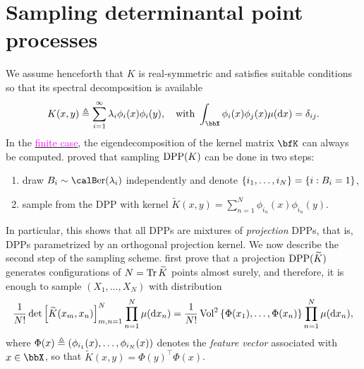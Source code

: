 \documentclass[twoside,11pt]{article}
\begin{document}

    \section{Sampling determinantal point processes} %
    \label{sec:sampling}

          We assume henceforth that $K$ is real-symmetric and satisfies suitable conditions \cite[Theorem 3]{Sos00} so that its spectral decomposition is available
          \begin{equation*}
          \label{eq:eigdec_kernel}
            K(x,y)
            \triangleq
              \suml_{i=1}^{\infty}
                \lambda_i \phi_i(x) \phi_i(y),
              \quad \text{with }
                \int_{\bbX} \phi_i(x) \phi_j(x) \mu(\diff x) = \delta_{ij}.
          \end{equation*}
          In the \href{https://dppy.readthedocs.io/en/latest/finite_dpps/exact_sampling.html}{\textcolor{magenta}{finite case}}, the eigendecomposition of the kernel matrix $\bfK$ can always be computed.
          \citet[Theorem 7, Algorithm 18]{HKPV06} proved that sampling $\operatorname{DPP}(K)$ can be done in two steps:
          \begin{enumerate}
            \item draw $B_i\sim\Ber(\lambda_i)$ independently and denote $\left\{ i_1,\dots,i_{N} \right\} = \left\{ i:B_i=1 \right\}$,
            \item sample from the DPP with kernel $\tilde{K}(x,y) = \sum_{n=1}^{N}\phi_{i_n}(x) \phi_{i_n}(y)$.
          \end{enumerate}
          In particular, this shows that all DPPs are mixtures of \emph{projection} DPPs, that is, DPPs parametrized by an orthogonal projection kernel.
          We now describe the second step of the sampling scheme.
          \cite{HKPV06} first prove that a projection $\operatorname{DPP}(\widetilde{K})$ generates configurations of $N=\operatorname{Tr} \widetilde{K}$ points almost surely, and therefore, it is enough to sample $(X_1,\dots,X_N)$ with distribution
          \begin{equation}
          \label{eq:joint_distribution1}
            \frac{1}{N!}
              \det \left[ \widetilde K(x_m,x_n) \right]_{m,n=1}^N
                \prod_{n=1}^N \mu(\mathop{}\!\mathrm{d} x_n)
            = \frac{1}{N!}
                \operatorname{Vol}^2\left\{ \Phi(x_1),\dots,\Phi(x_n) \right\}
                  \prod_{n=1}^N \mu(\mathop{}\!\mathrm{d} x_n),
          \end{equation}
          where $\Phi(x) \triangleq \left( \phi_{i_1}(x),\dots,\phi_{i_N}(x) \right)$ denotes the \emph{feature vector} associated with $x\in\bbX$, so that $\tilde{K}(x,y) = \Phi(y)^{\top} \Phi(x)$.
\end{document}
